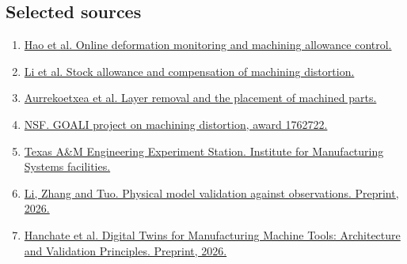 \documentclass[11pt,letterpaper]{article}
\begin{document}
\subsection*{Selected sources}

\begin{enumerate}
\small\setlength{\itemsep}{0pt}
\item \href{https://doi.org/10.1016/j.cja.2020.03.038}{Hao et al. Online deformation monitoring and machining allowance control.}
\item \href{https://doi.org/10.1016/j.cirp.2015.04.025}{Li et al. Stock allowance and compensation of machining distortion.}
\item \href{https://doi.org/10.3390/jmmp8010009}{Aurrekoetxea et al. Layer removal and the placement of machined parts.}
\item \href{https://www.nsf.gov/awardsearch/showAward?AWD_ID=1762722}{NSF. GOALI project on machining distortion, award 1762722.}
\item \href{https://texasmakes.tamu.edu/facilities/}{Texas A\&M Engineering Experiment Station. Institute for Manufacturing Systems facilities.}
\item \href{https://arxiv.org/abs/2604.17144}{Li, Zhang and Tuo. Physical model validation against observations. Preprint, 2026.}
\item \href{https://ssrn.com/abstract=7243783}{Hanchate et al. Digital Twins for Manufacturing Machine Tools: Architecture and Validation Principles. Preprint, 2026.}
\end{enumerate}
\end{document}
